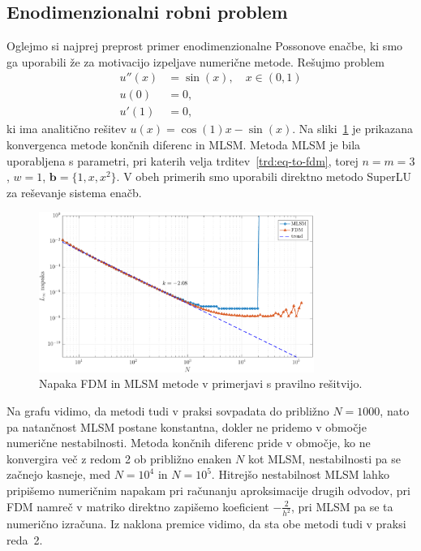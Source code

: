 \documentclass[12pt,a4paper]{article}
\theoremstyle{definition} %
\theoremstyle{plain} %
\numberwithin{equation}{section}
\renewcommand{\b}{\boldsymbol}
\begin{document}
\subsection{Enodimenzionalni robni problem}
Oglejmo si najprej preprost primer enodimenzionalne Possonove enačbe,
ki smo ga uporabili že za motivacijo izpeljave numerične metode.
Rešujmo problem
\begin{align*}
  u''(x) &= \sin(x), \quad x \in (0, 1) \\
  u(0) &= 0, \\
  u'(1) &= 0,
\end{align*}
ki ima analitično rešitev $u(x) = \cos(1) x - \sin(x)$.
Na sliki~\ref{fig:mlsm-fdm-err} je prikazana konvergenca metode končnih diferenc
in MLSM. Metoda MLSM je bila uporabljena s parametri, pri katerih velja
trditev~\ref{trd:eq-to-fdm}, torej $n=m=3$, $w=1$, $\b b = \{1, x, x^2\}$.
V obeh primerih smo uporabili direktno metodo SuperLU za reševanje sistema
enačb.

\begin{figure}[h]
  \centering
  \includegraphics[width=0.8\textwidth]{images/lap1d_convergence.pdf}
  \caption{Napaka FDM in MLSM metode v primerjavi s pravilno rešitvijo.}
  \label{fig:mlsm-fdm-err}
\end{figure}

Na grafu vidimo, da metodi tudi v praksi sovpadata do približno $N=1000$, nato
pa natančnost MLSM postane konstantna, dokler ne pridemo v območje numerične
nestabilnosti. Metoda končnih diferenc pride v območje, ko ne konvergira več z
redom 2 ob približno enaken $N$ kot MLSM, nestabilnosti pa se začnejo kasneje,
med $N = 10^4$ in $N = 10^5$. Hitrejšo nestabilnost MLSM lahko pripišemo
numeričnim napakam pri računanju aproksimacije drugih odvodov, pri FDM namreč v
matriko direktno zapišemo koeficient $-\frac{2}{h^2}$, pri MLSM pa se ta
numerično izračuna.  Iz naklona premice vidimo, da sta obe metodi tudi v praksi
reda~2.
\end{document}
